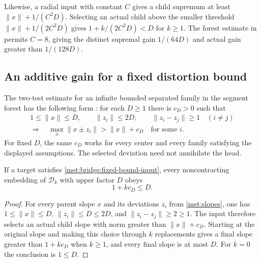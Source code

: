 Likewise, a radial input with constant $C$ gives a child supremum at
least $\|x\|+1/(C^2D)$. Selecting an actual child above the smaller
threshold $\|x\|+1/(2C^2D)$ gives
$1+k/(2C^2D)<D$ for $k\ge1$. The forest estimate in
\cite[Proposition~20.1]{SegmentLenses} permits $C=8$, giving the distinct
supremal gain $1/(64D)$ and actual gain greater than $1/(128D)$.

\subsection{An additive gain for a fixed distortion bound}
\label{met:bridge:fixed-bound-section}
The two-test estimate for an infinite bounded separated family in the segment
forest has the following form \cite[Proposition~11.3]{SegmentLenses}: for each $D\ge1$
there is $c_D>0$ such that
\begin{equation}\label{met:bridge:fixed-bound-input}
 \begin{gathered}
 1\le\|x\|\le D,\qquad \|z_i\|\le2D,\qquad
 \|z_i-z_j\|\ge1\quad(i\ne j)\\
 \Longrightarrow\quad
 \max_\pm\|x\pm z_i\|>\|x\|+c_D
 \quad\text{for some }i.
 \end{gathered}
\end{equation}
For fixed $D$, the same $c_D$ works for every center and every family
satisfying the displayed assumptions. The selected deviation need not
annihilate the head.

\begin{proposition}\label{met:bridge:fixed-bound}
If a target satisfies \eqref{met:bridge:fixed-bound-input}, every
noncontracting embedding of $\mathcal D_k$ with upper factor $D$ obeys
\[
 1+kc_D\le D.
\]
\end{proposition}
\begin{proof}
For every parent slope $x$ and its deviations $z_i$ from
\eqref{met:slopes}, one has $1\le\|x\|\le D$,
$\|z_i\|\le D\le2D$, and $\|z_i-z_j\|\ge2\ge1$.
The input therefore selects an actual child slope with norm greater
than $\|x\|+c_D$. Starting at the original slope and making this
choice through $k$ replacements gives a final slope greater than
$1+kc_D$ when $k\ge1$, and every final slope is at most $D$.
For $k=0$ the conclusion is $1\le D$.
\end{proof}

